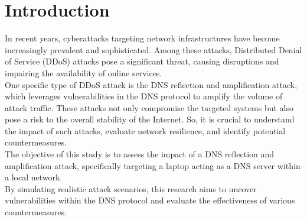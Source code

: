 \section{Introduction}
	In recent years, cyberattacks targeting network infrastructures have become increasingly prevalent and sophisticated.
	Among these attacks, Distributed Denial of Service (DDoS) attacks pose a significant threat, causing disruptions and impairing the availability of online services.\\
	One specific type of DDoS attack is the DNS reflection and amplification attack, which leverages vulnerabilities in the DNS protocol
	to amplify the volume of attack traffic.
	These attacks not only compromise the targeted systems but also pose a risk to the overall stability of the Internet.
	So, it is crucial to understand the impact of such attacks, evaluate network resilience, and identify potential countermeasures.\\
	The objective of this study is to assess the impact of a DNS reflection and amplification attack, 
    specifically targeting a laptop acting as a DNS server within a local network.\\ 
    By simulating realistic attack scenarios, this research aims to uncover vulnerabilities within the DNS protocol and evaluate the effectiveness 
    of various countermeasures.
